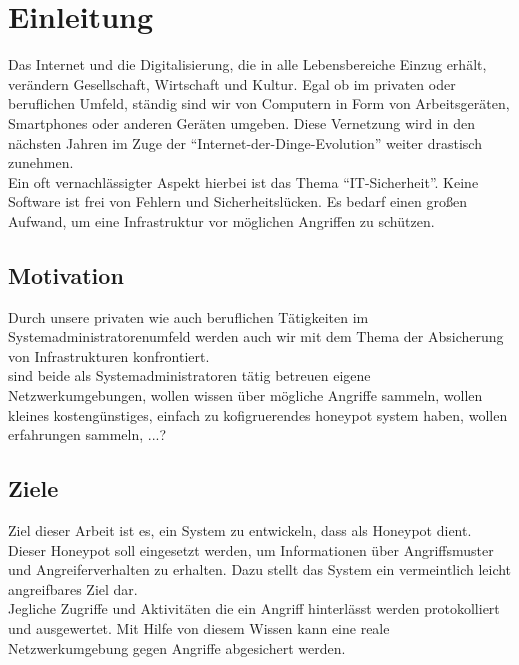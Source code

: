 \chapter{Einleitung}
\label{sec:einleitung}

Das Internet und die Digitalisierung, die in alle Lebensbereiche Einzug erhält, verändern Gesellschaft, Wirtschaft und Kultur.
Egal ob im privaten oder beruflichen Umfeld, ständig sind wir von Computern in Form von Arbeitsgeräten, Smartphones oder anderen Geräten umgeben.
Diese Vernetzung wird in den nächsten Jahren im Zuge der "`Internet-der-Dinge-Evolution"' weiter drastisch zunehmen.\\



Ein oft vernachlässigter Aspekt hierbei ist das Thema "`IT-Sicherheit"'. Keine Software ist frei von Fehlern und Sicherheitslücken. Es bedarf einen großen Aufwand, um eine Infrastruktur vor möglichen Angriffen zu schützen.


\section{Motivation}
\label{subsec:Motivation}
Durch unsere privaten wie auch beruflichen Tätigkeiten im Systemadministratorenumfeld werden auch wir mit dem Thema der Absicherung von Infrastrukturen konfrontiert.\\


sind beide als Systemadministratoren tätig betreuen eigene Netzwerkumgebungen, wollen wissen über mögliche Angriffe sammeln, wollen kleines kostengünstiges, einfach zu kofigruerendes honeypot system haben, wollen erfahrungen sammeln, ...?


\section{Ziele}
\label{subsec:Ziele}
Ziel dieser Arbeit ist es, ein System zu entwickeln, dass als Honeypot dient. Dieser Honeypot soll eingesetzt werden, um Informationen über Angriffsmuster und Angreiferverhalten zu erhalten. Dazu stellt das System ein vermeintlich leicht angreifbares Ziel dar.\\

Jegliche Zugriffe und Aktivitäten die ein Angriff hinterlässt werden protokolliert und ausgewertet. 
Mit Hilfe von diesem Wissen kann eine reale Netzwerkumgebung gegen Angriffe abgesichert werden.\\


